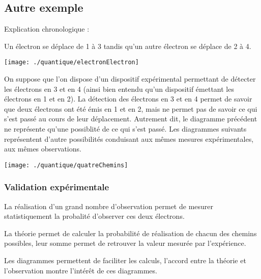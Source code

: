 \subsection{Autre exemple}

\begin{minipage}[c]{.45\linewidth}
\begin{center}
Explication chronologique :
\end{center}
Un électron se déplace de 1 à 3 tandis qu'un autre électron se déplace de 2 à 4.

\end{minipage}
\hfill
\begin{minipage}[c]{.45\linewidth}
\texttt{[image: ./quantique/electronElectron]}
\end{minipage}

\vspace{0.9cm}
On suppose que l'on dispose d'un dispositif expérimental permettant de détecter les électrons en 3 et en 4 (ainsi bien entendu qu'un dispositif émettant les électrons en 1 et en 2). La détection des électrons en 3 et en 4 permet de savoir que deux électrons ont été émis en 1 et en 2, mais ne permet pas de savoir ce qui s'est passé au cours de leur déplacement. Autrement dit, le diagramme précédent ne représente qu'une possiblité de ce qui s'est passé. Les diagrammes suivants représentent d'autre possibilités conduisant aux mêmes mesures expérimentales, aux mêmes observations.

\begin{center}
\texttt{[image: ./quantique/quatreChemins]}
\end{center}

\subsubsection{Validation expérimentale}


La réalisation d'un grand nombre d'observation permet de mesurer statistiquement la probalité d'observer ces deux électrons.

La théorie permet de calculer la probabilité de réalisation de chacun des chemins possibles, leur somme permet de retrouver la valeur mesurée par l'expérience.

Les diagrammes permettent de faciliter les calculs, l'accord entre la théorie et l'observation montre l'intérêt de ces diagrammes.

